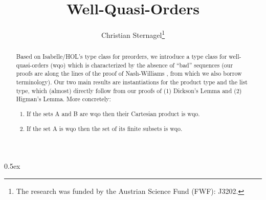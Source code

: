 \documentclass[11pt,a4paper]{article}
\begin{document}
\title{Well-Quasi-Orders}
\author{Christian Sternagel\thanks{%
  The research was funded by the Austrian Science Fund (FWF): J3202.}}
\maketitle

\begin{abstract}
Based on Isabelle/HOL's type class for preorders, we introduce a type class for
well-quasi-orders (wqo) which is characterized by the absence of ``bad''
sequences (our proofs are along the lines of the proof of Nash-Williams
\cite{N1963}, from which we also borrow terminology).  Our two main results are
instantiations for the product type and the list type, which (almost) directly
follow from our proofs of (1) Dickson's Lemma and (2) Higman's Lemma. More
concretely:
\begin{enumerate}
\item If the sets A and B are wqo then their Cartesian product is wqo.
\item If the set A is wqo then the set of its finite subsets is wqo.
\end{enumerate}
\end{abstract}

\tableofcontents


\parindent 0pt\parskip 0.5ex





\end{document}
